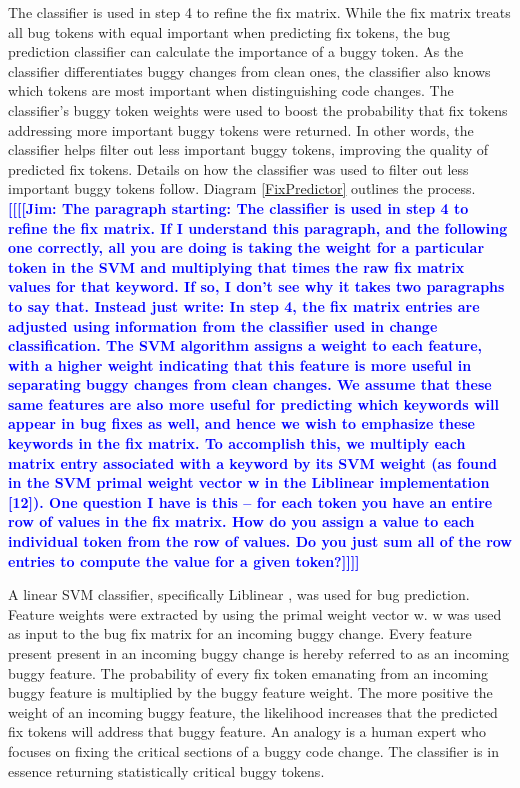 \documentclass[10pt, conference, letterpaper, compsocconf]{IEEEtran}
\newcommand{\todoc}[2]{{\textcolor{#1} {\textbf{[[#2]]}}}}
\newcommand{\todoblue}[1]{\todoc{blue}{\textbf{[[#1]]}}}
\newcommand{\jim}[1]{\todoblue{Jim: #1}}
\begin{document}
The classifier is used in step 4 to refine the fix matrix. 
While the fix matrix treats all bug tokens with equal important when predicting fix tokens,
the bug prediction classifier can calculate the importance of a buggy token. As the classifier differentiates buggy changes from clean ones,
the classifier also knows which tokens are most important when distinguishing code changes. The classifier's buggy token weights
were used to boost the probability that fix tokens addressing more important buggy tokens were returned. In other words,
the classifier helps filter out less important buggy tokens, improving the quality of predicted fix tokens.
Details on how the classifier was used to filter out less important buggy tokens follow. Diagram \ref{FixPredictor} outlines the process.
\jim{The paragraph starting: The classifier is used in step 4 to refine the fix matrix. If I understand this paragraph, and the following one correctly, all you are doing is taking the weight for a particular token in the SVM and multiplying that times the raw fix matrix values for that keyword. If so, I don't see why it takes two paragraphs to say that. Instead just write: In step 4, the fix matrix entries are adjusted using information from the classifier used in change classification. The SVM algorithm assigns a weight to each feature, with a higher weight indicating that this feature is more useful in separating buggy changes from clean changes. We assume that these same features are also more useful for predicting which keywords will appear in bug fixes as well, and hence we wish to emphasize these keywords in the fix matrix. To accomplish this, we multiply each matrix entry associated with a keyword by its SVM weight (as found in the SVM primal weight vector w in the Liblinear implementation [12]).   One question I have is this -- for each token you have an entire row of values in the fix matrix. How do you assign a value to each individual token from the row of values. Do you just sum all of the row entries to compute the value for a given token?}

A linear SVM classifier, specifically Liblinear \cite{fan2008liblinear}, was used for bug prediction.
Feature weights were extracted by using the primal weight vector w. w was used as input to the bug fix matrix for an incoming buggy change.
Every feature present present in an incoming buggy change is hereby referred to as an incoming buggy feature. The probability of
every fix token emanating from an incoming buggy feature is multiplied by the buggy feature weight.
The more positive the weight of an incoming buggy feature, the likelihood increases that the predicted fix tokens will address that buggy feature.
An analogy is a human expert who focuses on fixing the critical sections of a buggy code change. The classifier is in essence returning statistically critical buggy tokens.
\end{document}
